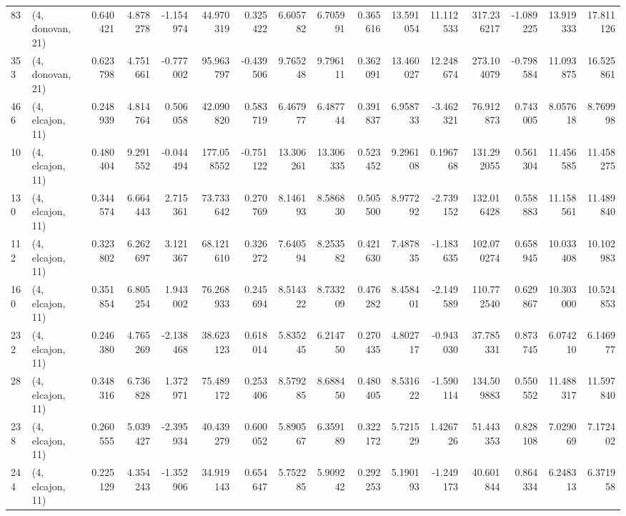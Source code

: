 \begin{tabular}{llrrrrrrrrrrrrrr}
83  &  (4, donovan, 21) &   0.640421 &   4.878278 &  -1.154974 &    44.970319 &   0.325422 &   6.605782 &   6.705991 &  0.365616 &  13.591054 &  11.112533 &    317.236217 &  -1.089225 &   13.919333 &   17.811126 \\
353 &  (4, donovan, 21) &   0.623798 &   4.751661 &  -0.777002 &    95.963797 &  -0.439506 &   9.765248 &   9.796111 &  0.362091 &  13.460027 &  12.248674 &    273.104079 &  -0.798584 &   11.093875 &   16.525861 \\
466 &  (4, elcajon, 11) &   0.248939 &   4.814764 &   0.506058 &    42.090820 &   0.583719 &   6.467977 &   6.487744 &  0.391837 &   6.958733 &  -3.462321 &     76.912873 &   0.743005 &    8.057618 &    8.769998 \\
10  &  (4, elcajon, 11) &   0.480404 &   9.291552 &  -0.044494 &   177.058552 &  -0.751122 &  13.306261 &  13.306335 &  0.523452 &   9.296108 &   0.196768 &    131.292055 &   0.561304 &   11.456585 &   11.458275 \\
130 &  (4, elcajon, 11) &   0.344574 &   6.664443 &   2.715361 &    73.733642 &   0.270769 &   8.146193 &   8.586830 &  0.505500 &   8.977292 &  -2.739152 &    132.016428 &   0.558883 &   11.158561 &   11.489840 \\
112 &  (4, elcajon, 11) &   0.323802 &   6.262697 &   3.121367 &    68.121610 &   0.326272 &   7.640594 &   8.253582 &  0.421630 &   7.487835 &  -1.183635 &    102.070274 &   0.658945 &   10.033408 &   10.102983 \\
160 &  (4, elcajon, 11) &   0.351854 &   6.805254 &   1.943002 &    76.268933 &   0.245694 &   8.514322 &   8.733209 &  0.476282 &   8.458401 &  -2.149589 &    110.772540 &   0.629867 &   10.303000 &   10.524853 \\
232 &  (4, elcajon, 11) &   0.246380 &   4.765269 &  -2.138468 &    38.623123 &   0.618014 &   5.835245 &   6.214750 &  0.270435 &   4.802717 &  -0.943030 &     37.785331 &   0.873745 &    6.074210 &    6.146977 \\
28  &  (4, elcajon, 11) &   0.348316 &   6.736828 &   1.372971 &    75.489172 &   0.253406 &   8.579285 &   8.688450 &  0.480405 &   8.531622 &  -1.590114 &    134.509883 &   0.550552 &   11.488317 &   11.597840 \\
238 &  (4, elcajon, 11) &   0.260555 &   5.039427 &  -2.395934 &    40.439279 &   0.600052 &   5.890567 &   6.359189 &  0.322172 &   5.721529 &   1.426726 &     51.443353 &   0.828108 &    7.029069 &    7.172402 \\
244 &  (4, elcajon, 11) &   0.225129 &   4.354243 &  -1.352906 &    34.919143 &   0.654647 &   5.752285 &   5.909242 &  0.292253 &   5.190193 &  -1.249173 &     40.601844 &   0.864334 &    6.248313 &    6.371958 \\

\end{tabular}
